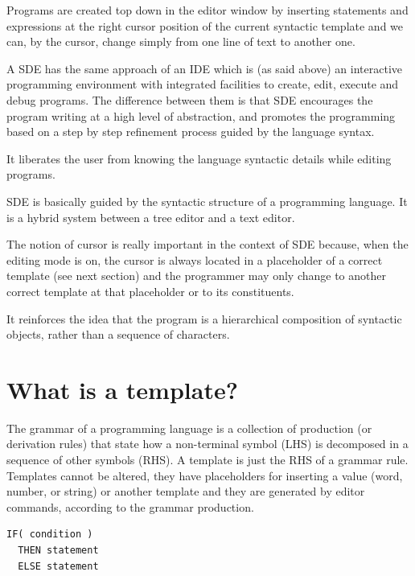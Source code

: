 \documentclass[
  oneside,
  11pt, a4paper,
  footinclude=true,
  headinclude=true,
  cleardoublepage=empty
]{scrbook}
\begin{document}
\newpage

Programs are created top down in the editor window by inserting statements and expressions at the right cursor position of the current syntactic template and we can, by the cursor, change simply from one line of text to another one.

A SDE has the same approach of an IDE which is (as said above) an interactive programming environment with integrated facilities to create, edit, execute and debug programs.
The difference between them is that SDE encourages the program writing at a high level of abstraction, and promotes the programming based on a step by step refinement process guided by the language syntax.

It liberates the user from knowing the language syntactic details while editing programs.

SDE is basically guided by the syntactic structure of a programming language. It is a hybrid system between a tree editor and a text editor.

The notion of cursor is really important in the context of SDE because, when the editing mode is on, the cursor is always located in a placeholder of a correct template (see next section) and the programmer may only change to another correct template at that placeholder or to its constituents.%

It reinforces the idea that the program is a hierarchical composition of syntactic objects, rather than a sequence of characters.

\section {What is a template?}

The grammar of a programming language is a collection of production (or derivation rules) that state how a non-terminal symbol (LHS) is decomposed in a sequence of other symbols (RHS). A template is just the RHS of a grammar rule.
Templates cannot be altered, they have placeholders for inserting a value (word, number, or string) or another template and they are generated by editor commands, according to the grammar production. %


\begin{lstlisting}[caption={Example of a IF Conditional template},label={lst:template}]
IF( condition )
  THEN statement
  ELSE statement
\end{lstlisting}
\end{document}

